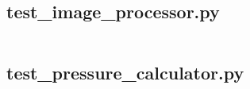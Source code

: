 	\subsection{test\_image\_processor.py}
		\inputminted[breaklines,
					linenos,
					frame=lines,
					fontsize=\footnotesize]{python}{../code/final_program/test_image_processor.py}
	\subsection{test\_pressure\_calculator.py}
		\inputminted[breaklines,
					linenos,
					frame=lines,
					fontsize=\footnotesize]{python}{../code/final_program/test_pressure_calculator.py}